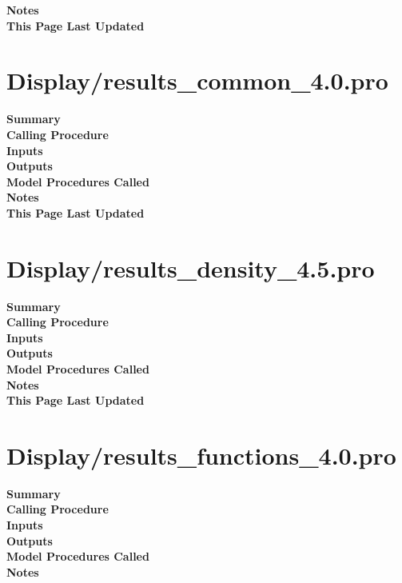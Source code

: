 \documentclass[11pt]{article}
\newcommand\descrip[1]{\textsf{\textbf{\large{#1}}}\\}
\begin{document}
\descrip{Notes}

\descrip{This Page Last Updated}

\clearpage

\section{Display/results\_common\_4.0.pro} \label{sec:results_common}

\descrip{Summary}

\descrip{Calling Procedure}

\descrip{Inputs}

\descrip{Outputs}

\descrip{Model Procedures Called}

\descrip{Notes}

\descrip{This Page Last Updated}

\clearpage

\section{Display/results\_density\_4.5.pro} \label{sec:results_density}

\descrip{Summary}

\descrip{Calling Procedure}

\descrip{Inputs}

\descrip{Outputs}

\descrip{Model Procedures Called}

\descrip{Notes}

\descrip{This Page Last Updated}

\clearpage

\section{Display/results\_functions\_4.0.pro} \label{sec:results_functions}

\descrip{Summary}

\descrip{Calling Procedure}

\descrip{Inputs}

\descrip{Outputs}

\descrip{Model Procedures Called}

\descrip{Notes}
\end{document}
